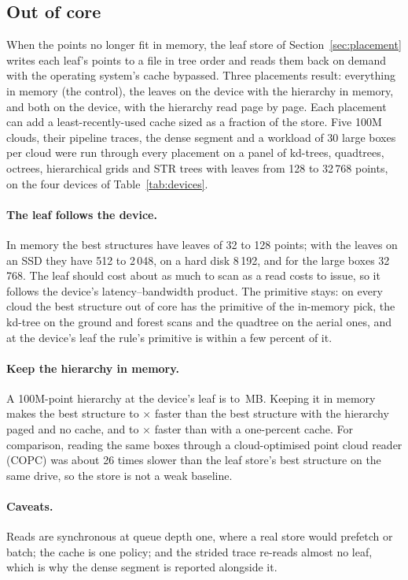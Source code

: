 \subsection{Out of core}\label{sec:ooc}

When the points no longer fit in memory, the leaf store of Section~\ref{sec:placement} writes each leaf's points to a file in tree order and reads them back on demand with the operating system's cache bypassed. Three placements result: everything in memory (the control), the leaves on the device with the hierarchy in memory, and both on the device, with the hierarchy read page by page. Each placement can add a least-recently-used cache sized as a fraction of the store. Five 100M clouds, their pipeline traces, the dense segment and a workload of 30 large boxes per cloud were run through every placement on a panel of kd-trees, quadtrees, octrees, hierarchical grids and STR trees with leaves from 128 to 32\,768 points, on the four devices of Table~\ref{tab:devices}.


\paragraph{The leaf follows the device.} In memory the best structures have leaves of 32 to 128 points; with the leaves on an SSD they have 512 to 2\,048, on a hard disk 8\,192, and for the large boxes 32\,768. The leaf should cost about as much to scan as a read costs to issue, so it follows the device's latency--bandwidth product. The primitive stays: on every cloud the best structure out of core has the primitive of the in-memory pick, the kd-tree on the ground and forest scans and the quadtree on the aerial ones, and at the device's leaf the rule's primitive is within a few percent of it.

\paragraph{Keep the hierarchy in memory.} A 100M-point hierarchy at the device's leaf is \hierarchyMbMin{} to \hierarchyMbMax\,MB. Keeping it in memory makes the best structure \pagedOverPinnedMinNoCache{} to \pagedOverPinnedMaxNoCache$\times$ faster than the best structure with the hierarchy paged and no cache, and \pagedOverPinnedMinCache{} to \pagedOverPinnedMaxCache$\times$ faster than with a one-percent cache. For comparison, reading the same boxes through a cloud-optimised point cloud reader (COPC) was about 26 times slower than the leaf store's best structure on the same drive, so the store is not a weak baseline.

\paragraph{Caveats.} Reads are synchronous at queue depth one, where a real store would prefetch or batch; the cache is one policy; and the strided trace re-reads almost no leaf, which is why the dense segment is reported alongside it.
